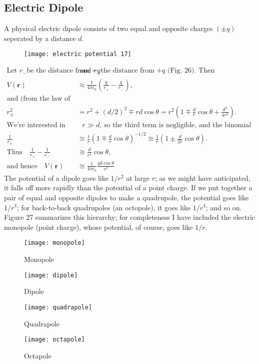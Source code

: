\subsection{Electric Dipole}
 A physical electric dipole consists of two equal and opposite charges $(\pm q)$ seperated by a distance $d$. 
\begin{figure}[H]
	\centering
	\texttt{[image: electric potential 17]}
	\caption{}
	\label{}
\end{figure}
\begin{align*}
\text{Let $r_{-}$be the distance from $-q$}&\text{  and $r_{+}$the distance from $+q$ (Fig. 26). Then}\\
V(\mathbf{r})&\approx\frac{1}{4 \pi \epsilon_{0}}\left(\frac{q}{r_{+}}-\frac{q}{r_{-}}\right),\\
\text{and (from the law of cosines)}\\
r_{\pm}^{2}&=r^{2}+(d / 2)^{2} \mp r d \cos \theta=r^{2}\left(1 \mp \frac{d}{r} \cos \theta+\frac{d^{2}}{4 r^{2}}\right) .\\
\text{We're interested in the régime}&\text{ $r \gg d$, so the third term is negligible, and the binomial expansion yields}\\
\frac{1}{r_{\pm}} &\cong \frac{1}{r}\left(1 \mp \frac{d}{r} \cos \theta\right)^{-1 / 2} \cong \frac{1}{r}\left(1 \pm \frac{d}{2 r} \cos \theta\right) \text {. }\\
\text{Thus}\quad
\frac{1}{r_{+}}-\frac{1}{r_{-}} &\cong \frac{d}{r^{2}} \cos \theta,\\
\text{and hence}\quad
V(\mathbf{r}) &\cong \frac{1}{4 \pi \epsilon_{0}} \frac{q d \cos \theta}{r^{2}}
\end{align*}
The potential of a dipole goes like $1 / r^{2}$ at large $r$; as we might have anticipated, it falls off more rapidly than the potential of a point charge. If we put together a pair of equal and opposite dipoles to make a quadrupole, the potential goes like $1 / r^{3}$; for back-to-back quadrupoles (an octopole), it goes like $1 / r^{4}$; and so on. Figure 27 summarizes this hierarchy; for completeness I have included the electric monopole (point charge), whose potential, of course, goes like $1 / r$.
\begin{figure}[H]
	\begin{minipage}{0.24\textwidth}
		\texttt{[image: monopole]}
		\caption{Monopole}
	\end{minipage}
	\begin{minipage}{0.24\textwidth}
		\texttt{[image: dipole]}
		\caption{Dipole}
	\end{minipage}
	\begin{minipage}{0.24\textwidth}
		\texttt{[image: quadrapole]}
		\caption{Quadrapole}
	\end{minipage}
	\begin{minipage}{0.24\textwidth}
		\texttt{[image: octapole]}
		\caption{Octapole}
	\end{minipage}
\end{figure}
